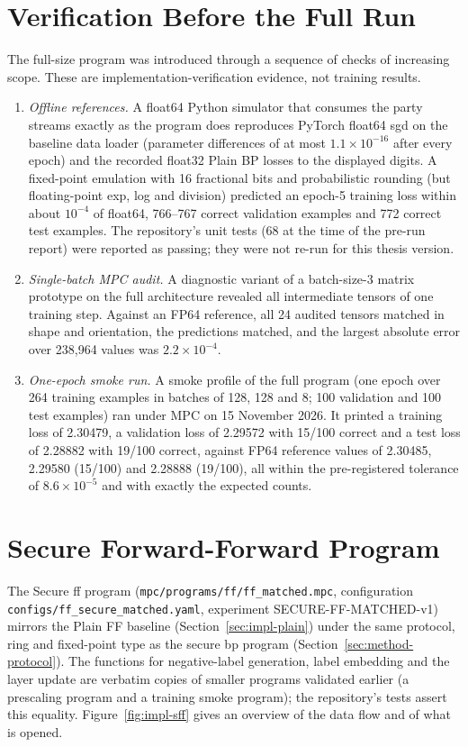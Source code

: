 \section{Verification Before the Full Run}\label{sec:impl-verify}
The full-size program was introduced through a sequence of checks of increasing scope. These are implementation-verification evidence, not training results.
\begin{enumerate}
  \item \emph{Offline references.} A float64 Python simulator that consumes the party streams exactly as the program does reproduces PyTorch float64 \ac{sgd} on the baseline data loader (parameter differences of at most $1.1\times10^{-16}$ after every epoch) and the recorded float32 Plain BP losses to the displayed digits. A fixed-point emulation with 16 fractional bits and probabilistic rounding (but floating-point exp, log and division) predicted an epoch-5 training loss within about $10^{-4}$ of float64, 766--767 correct validation examples and 772 correct test examples. The repository's unit tests (68 at the time of the pre-run report) were reported as passing; they were not re-run for this thesis version.
  \item \emph{Single-batch MPC audit.} A diagnostic variant of a batch-size-3 matrix prototype on the full architecture revealed all intermediate tensors of one training step. Against an FP64 reference, all 24 audited tensors matched in shape and orientation, the predictions matched, and the largest absolute error over 238{,}964 values was $2.2\times10^{-4}$.
  \item \emph{One-epoch smoke run.} A smoke profile of the full program (one epoch over 264 training examples in batches of 128, 128 and 8; 100 validation and 100 test examples) ran under MPC on 15 November 2026. It printed a training loss of 2.30479, a validation loss of 2.29572 with 15/100 correct and a test loss of 2.28882 with 19/100 correct, against FP64 reference values of 2.30485, 2.29580 (15/100) and 2.28888 (19/100), all within the pre-registered tolerance of $8.6\times10^{-5}$ and with exactly the expected counts.
\end{enumerate}

\section{Secure Forward-Forward Program}\label{sec:impl-sff}
The Secure \ac{ff} program (\texttt{mpc/\allowbreak programs/\allowbreak ff/\allowbreak ff\_\allowbreak matched.mpc}, configuration \texttt{configs/\allowbreak ff\_\allowbreak secure\_\allowbreak matched.yaml}, experiment SECURE-FF-MATCHED-v1) mirrors the Plain FF baseline (Section~\ref{sec:impl-plain}) under the same protocol, ring and fixed-point type as the secure \ac{bp} program (Section~\ref{sec:method-protocol}). The functions for negative-label generation, label embedding and the layer update are verbatim copies of smaller programs validated earlier (a prescaling program and a training smoke program); the repository's tests assert this equality. Figure~\ref{fig:impl-sff} gives an overview of the data flow and of what is opened.

